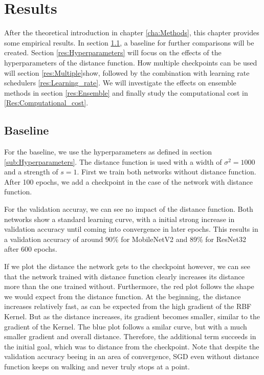\chapter{Results}
After the theoretical introduction in chapter \ref{cha:Methods}, this chapter
provides some empirical results. In section \ref{res:Baseline}, a baseline for
further comparisons will be created. Section \ref{res:Hyperparameters} will
focus on the effects of the hyperparameters of the distance function. How
multiple checkpoints can be used will section \ref{res:Multiple}show, followed
by the combination with learning rate schedulers \ref{res:Learning_rate}. We
will investigate the effects on ensemble methods in section \ref{res:Ensemble}
and finally study the computational cost in \ref{Res:Computational_cost}.



\section{Baseline}\label{res:Baseline} For the baseline, we use the
hyperparameters as defined in section \ref{sub:Hyperparameters}. The distance
function is used with a width of $\sigma^2=1000$ and a strength of $s=1$. First
we train both networks without distance function. After 100 epochs, we add a
checkpoint in the case of the network with distance function.

For the validation accuray, we can see no impact of the distance function. Both
networks show a standard learning curve, with a initial strong increase in
validation accuracy until coming into convergence in later epochs. This results
in a validation accuracy of around 90\% for MobileNetV2 and 89\% for ResNet32
after 600 epochs.

If we plot the distance the network gets to the checkpoint however, we can see
that the network trained with distance function clearly increases its distance
more than the one trained without. Furthermore, the red plot follows the shape
we would expect from the distance function. At the beginning, the distance
increases relatively fast, as can be expected from the high gradient of the RBF
Kernel. But as the distance increases, its gradient becomes smaller, similar to
the gradient of the Kernel. The blue plot follows a smilar curve, but with a
much smaller gradient and overall distance. Therefore, the additional term
succeeds in the initial goal, which was to distance from the checkpoint. Note
that despite the validation accuracy beeing in an area of convergence, SGD even
without distance function keeps on walking and never truly stops at a point.

